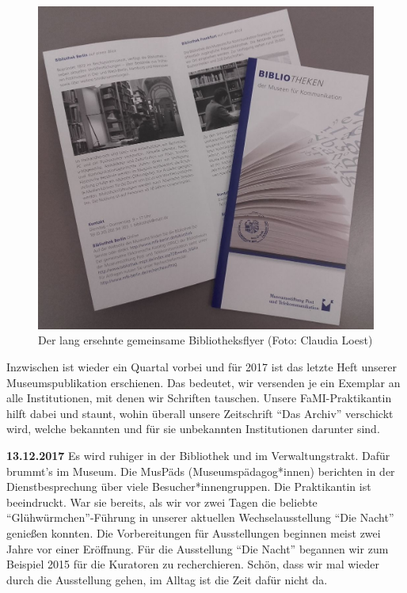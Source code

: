 \documentclass[a4paper,
fontsize=11pt,
oneside,
numbers=noperiodatend,
parskip=half-,
bibliography=totoc,
final
]{scrartcl}
\begin{document}
\begin{figure}
\centering
\includegraphics{img/Loest_1.jpg}
\caption{Der lang ersehnte gemeinsame Bibliotheksflyer (Foto: Claudia
Loest)}
\end{figure}

Inzwischen ist wieder ein Quartal vorbei und für 2017 ist das letzte
Heft unserer Museumspublikation erschienen. Das bedeutet, wir versenden
je ein Exemplar an alle Institutionen, mit denen wir Schriften tauschen.
Unsere FaMI-Praktikantin hilft dabei und staunt, wohin überall unsere
Zeitschrift \enquote{Das Archiv} verschickt wird, welche bekannten und
für sie unbekannten Institutionen darunter sind.

\textbf{13.12.2017} Es wird ruhiger in der Bibliothek und im
Verwaltungstrakt. Dafür brummt's im Museum. Die MusPäds
(Museumspädagog*innen) berichten in der Dienstbesprechung über viele
Besucher*innengruppen. Die Praktikantin ist beeindruckt. War sie
bereits, als wir vor zwei Tagen die beliebte
\enquote{Glühwürmchen}-Führung in unserer aktuellen Wechselausstellung
\enquote{Die Nacht} genießen konnten. Die Vorbereitungen für
Ausstellungen beginnen meist zwei Jahre vor einer Eröffnung. Für die
Ausstellung \enquote{Die Nacht} begannen wir zum Beispiel 2015 für die
Kuratoren zu recherchieren. Schön, dass wir mal wieder durch die
Ausstellung gehen, im Alltag ist die Zeit dafür nicht da.
\end{document}
